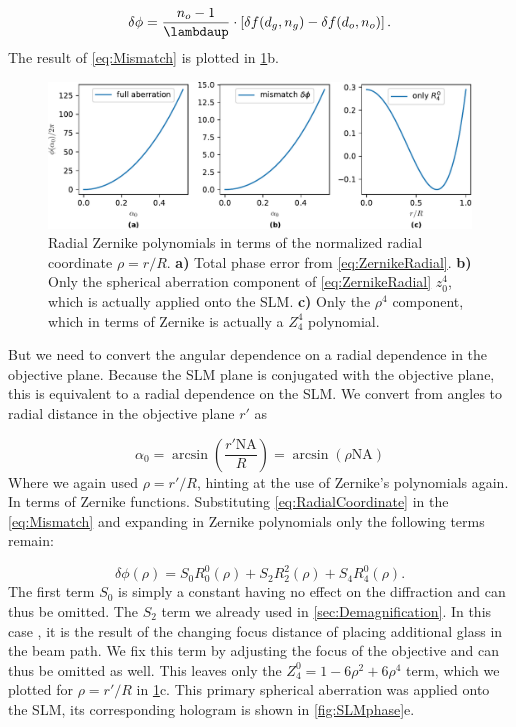\begin{equation}\label{eq:Mismatch}
    \delta \phi=
    \frac{n_o-1}{\lambdaup}\cdot
    \left[\delta f(d_g,n_g)-\delta f(d_o,n_o)\right].
\end{equation}
The result of \cref{eq:Mismatch} is plotted in \cref{fig:AberrationTerm}b.
\begin{figure}
    \centering
    \includegraphics[width=\textwidth]{figures/SphericalAberrationTerms.pdf}
    \caption{
    Radial Zernike polynomials in terms of the normalized radial coordinate $\rho = r/R$.
    \textsf{\textbf{a)}} Total phase error from \cref{eq:ZernikeRadial}.
    \textsf{\textbf{b)}} Only the spherical aberration component of \cref{eq:ZernikeRadial} $z_0^4$, which is actually applied onto the SLM.
    \textsf{\textbf{c)}} Only the $\rho^4$ component, which in terms of Zernike is actually a $Z_4^4$ polynomial.
    }
    \label{fig:AberrationTerm}
\end{figure}
But we need to convert the angular dependence on a radial dependence in the objective plane. 
Because the SLM plane is conjugated with the objective plane, this is equivalent to a radial dependence on the SLM. We convert from angles to radial distance in the objective plane $r'$ as

\begin{equation}\label{eq:RadialCoordinate}
    \alpha_0 = \operatorname{arcsin}\left(\frac{r'\text{NA}}{R}\right)
    =\operatorname{arcsin}\left(\rho \text{NA}\right)
\end{equation}
Where we again used $\rho=r'/R$, hinting at the use of Zernike's polynomials again.
In terms of Zernike functions.
Substituting \cref{eq:RadialCoordinate} in the \cref{eq:Mismatch} and expanding in Zernike polynomials only the following terms remain:

\begin{equation}
    \delta \phi(\rho) = S_0 R_0^0(\rho) + S_2 R_2^2(\rho) + S_4 R_4^0(\rho).
\end{equation}
The first term $S_0$ is simply a constant having no effect on the diffraction and can thus be omitted. 
The $S_2$ term we already used in \cref{sec:Demagnification}.
In this case , it is the result of the changing focus distance of placing additional glass in the beam path.
We fix this term by adjusting the focus of the objective and can thus be omitted as well.
This leaves only the $Z_4^0 = 1 - 6 \rho^2 + 6 \rho^4$ term, which we plotted for $\rho=r'/R$ in \cref{fig:AberrationTerm}c.
This primary spherical aberration was applied onto the SLM, its corresponding hologram is shown in \cref{fig:SLMphase}e.


